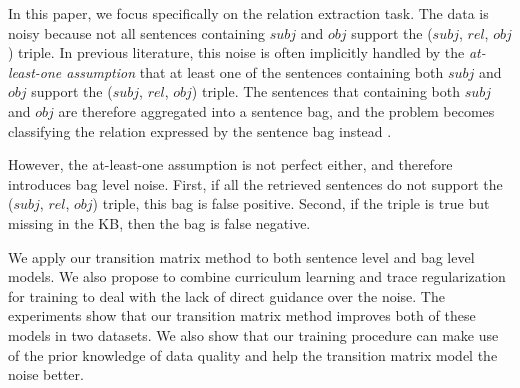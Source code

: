 


In this paper, we focus specifically on the relation extraction task. The data is noisy because not all sentences containing $subj$ and $obj$ support the ($subj$, $rel$, $obj$) triple.  In previous literature, this noise is often implicitly handled by the \emph{at-least-one assumption} that at least one of the sentences containing both $subj$ and $obj$ support the ($subj$, $rel$, $obj$) triple. The  sentences that containing both $subj$ and $obj$ are therefore aggregated into a sentence bag, and the problem becomes classifying the relation expressed by the sentence bag instead \cite{riedel2010modeling,lin2016neural}.

However, the at-least-one assumption is not perfect either, and therefore introduces bag level noise. First, if all the retrieved sentences do not support the ($subj$, $rel$, $obj$) triple, this bag is false positive. Second, if the triple is true but missing in the KB, then the bag is false negative. 

We apply our transition matrix method to both sentence level and bag level models. We also propose to combine curriculum learning and trace regularization for training to deal with the lack of direct guidance over the noise. The experiments show that our transition matrix method improves both of these models in two datasets. We also show that our training procedure can make use of the prior knowledge of data quality and help the transition matrix model the noise better. 

